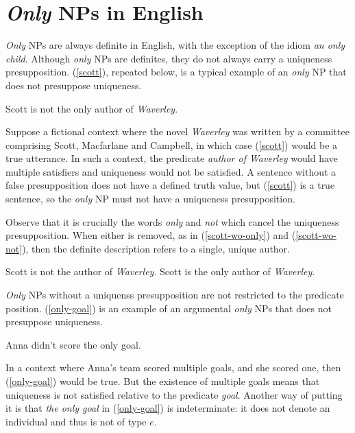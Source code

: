 \section{\textit{Only} NPs in English \label{sec:only-nps-english}}
\textit{Only} NPs are always definite in English, with the exception of the idiom \textit{an only child}. Although \textit{only} NPs are definites, they do not always carry a uniqueness presupposition. (\ref{scott}), repeated below, is a typical example of an \textit{only} NP that does not presuppose uniqueness.


\begin{exe}
	 Scott is not the only author of \textit{Waverley}.
\end{exe}

Suppose a fictional context where the novel \textit{Waverley} was written by a committee comprising Scott, Macfarlane and Campbell, in which case (\ref{scott}) would be a true utterance. In such a context, the predicate \textit{author of Waverley} would have multiple satisfiers and uniqueness would not be satisfied. A sentence without a false presupposition does not have a defined truth value, but (\ref{scott}) is a true sentence, so the \textit{only} NP must not have a uniqueness presupposition.

Observe that it is crucially the words \textit{only} and \textit{not} which cancel the uniqueness presupposition. When either is removed, as in (\ref{scott-wo-only}) and (\ref{scott-wo-not}), then the definite description refers to a single, unique author.

\begin{exe}
	\ex \label{scott-wo-only} Scott is not the author of \textit{Waverley}.
	\ex \label{scott-wo-not} Scott is the only author of \textit{Waverley}.
\end{exe}

\textit{Only} NPs without a uniquenss presupposition are not restricted to the predicate position. (\ref{only-goal}) is an example of an argumental \textit{only} NPs that does not presuppose uniqueness.

\begin{exe}
	\ex \label{only-goal} Anna didn't score the only goal.
\end{exe}

In a context where Anna's team scored multiple goals, and she scored one, then (\ref{only-goal}) would be true. But the existence of multiple goals means that uniqueness is not satisfied relative to the predicate \textit{goal}. Another way of putting it is that \textit{the only goal} in (\ref{only-goal}) is indeterminate: it does not denote an individual and thus is not of type $e$.

